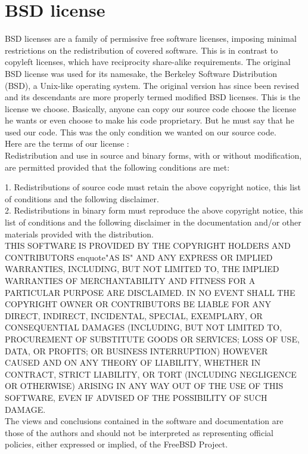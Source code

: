 \documentclass[article]{report}             %
\begin{document}
			\section{BSD license}
				BSD licenses are a family of permissive free software licenses, imposing minimal restrictions on the redistribution of covered software. This is in contrast to copyleft licenses, which have reciprocity share-alike requirements. The original BSD license was used for its namesake, the Berkeley Software Distribution (BSD), a Unix-like operating system. The original version has since been revised and its descendants are more properly termed modified BSD licenses.
				This is the license we choose. Basically, anyone can copy our source code choose the license he wants or even choose to make his code proprietary. But he must say that he used our code. This was the only condition we wanted on our source code.\\
Here are the terms of our license : \\

Redistribution and use in source and binary forms, with or without
modification, are permitted provided that the following conditions are met: 

1. Redistributions of source code must retain the above copyright notice, this list of conditions and the following disclaimer. \\
2. Redistributions in binary form must reproduce the above copyright notice, this list of conditions and the following disclaimer in the documentation and/or other materials provided with the distribution.\\

THIS SOFTWARE IS PROVIDED BY THE COPYRIGHT HOLDERS AND CONTRIBUTORS enquote{"AS IS"} AND
ANY EXPRESS OR IMPLIED WARRANTIES, INCLUDING, BUT NOT LIMITED TO, THE IMPLIED
WARRANTIES OF MERCHANTABILITY AND FITNESS FOR A PARTICULAR PURPOSE ARE
DISCLAIMED. IN NO EVENT SHALL THE COPYRIGHT OWNER OR CONTRIBUTORS BE LIABLE FOR
ANY DIRECT, INDIRECT, INCIDENTAL, SPECIAL, EXEMPLARY, OR CONSEQUENTIAL DAMAGES
(INCLUDING, BUT NOT LIMITED TO, PROCUREMENT OF SUBSTITUTE GOODS OR SERVICES;
LOSS OF USE, DATA, OR PROFITS; OR BUSINESS INTERRUPTION) HOWEVER CAUSED AND
ON ANY THEORY OF LIABILITY, WHETHER IN CONTRACT, STRICT LIABILITY, OR TORT
(INCLUDING NEGLIGENCE OR OTHERWISE) ARISING IN ANY WAY OUT OF THE USE OF THIS
SOFTWARE, EVEN IF ADVISED OF THE POSSIBILITY OF SUCH DAMAGE.\\

The views and conclusions contained in the software and documentation are those
of the authors and should not be interpreted as representing official policies, 
either expressed or implied, of the FreeBSD Project.\\
\end{document}
